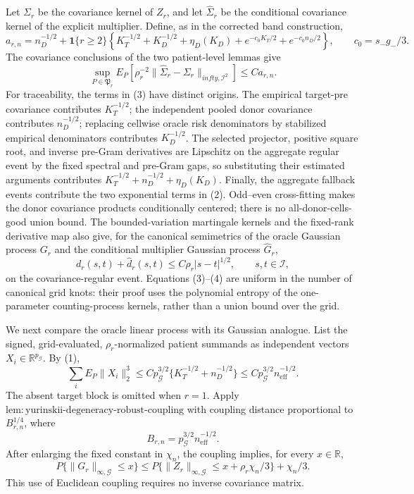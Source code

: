Let \(\Sigma_r\) be the covariance kernel of \(Z_r\), and let
\(\widehat\Sigma_r\) be the conditional covariance kernel of the explicit
multiplier.  Define, as in the corrected band construction,
\[
 a_{r,n}=n_D^{-1/2}+\mathbf1\{r\ge2\}
 \left\{K_T^{-1/2}+K_D^{-1/2}+\eta_D(K_D)
 +e^{-c_0K_T/2}+e^{-c_0n_D/2}\right\},
 \qquad c_0=s_-g_-/3.                                      \tag{2}
\]
The covariance conclusions of the two patient-level lemmas give
\[
 \sup_{P\in\mathfrak P_r}E_P\left[
 \rho_r^{-2}\|\widehat\Sigma_r-\Sigma_r\|_{infty,\mathcal I^2}
 \right]\le C a_{r,n}.                                    \tag{3}
\]
For traceability, the terms in (3) have distinct origins.  The empirical
target-pre covariance contributes \(K_T^{-1/2}\); the independent pooled
donor covariance contributes \(n_D^{-1/2}\); replacing cellwise oracle risk
denominators by stabilized empirical denominators contributes
\(K_D^{-1/2}\).  The selected projector, positive square root, and inverse
pre-Gram derivatives are Lipschitz on the aggregate regular event by the
fixed spectral and pre-Gram gaps, so substituting their estimated arguments
contributes \(K_T^{-1/2}+n_D^{-1/2}+\eta_D(K_D)\).  Finally, the aggregate
fallback events contribute the two exponential terms in (2).  Odd--even
cross-fitting makes the donor covariance products conditionally centered;
there is no all-donor-cells-good union bound.  The bounded-variation
martingale kernels and the fixed-rank derivative map also give, for the
canonical semimetrics of the oracle Gaussian process \(G_r\) and the
conditional multiplier Gaussian process \(\widehat G_r\),
\[
 d_r(s,t)+\widehat d_r(s,t)
 \le C\rho_r|s-t|^{1/2},\qquad s,t\in\mathcal I,            \tag{4}
\]
on the covariance-regular event.  Equations (3)--(4) are uniform in the
number of canonical grid knots: their proof uses the polynomial entropy of
the one-parameter counting-process kernels, rather than a union bound over
the grid.

We next compare the oracle linear process with its Gaussian analogue.  List
the signed, grid-evaluated, \(\rho_r\)-normalized patient summands as
independent vectors \(X_i\in\mathbb R^{p_{\mathcal G}}\).  By (1),
\[
 \sum_iE_P\|X_i\|_2^3
 \le C p_{\mathcal G}^{3/2}
 \{K_T^{-1/2}+n_D^{-1/2}\}
 \le C p_{\mathcal G}^{3/2}n_{\mathrm{eff}}^{-1/2}.        \tag{5}
\]
The absent target block is omitted when \(r=1\).  Apply
\(\mathrm{lem:yurinskii\mbox{-}degeneracy\mbox{-}robust\mbox{-}coupling}\)
with coupling distance proportional to
\(B_{r,n}^{1/4}\), where
\[
 B_{r,n}=p_{\mathcal G}^{3/2}n_{\mathrm{eff}}^{-1/2}.       \tag{6}
\]
After enlarging the fixed constant in \(\chi_n\), the coupling implies,
for every \(x\in\mathbb R\),
\[
 P\{\|G_r\|_{\infty,\mathcal G}\le x\}
 \le P\{\|Z_r\|_{\infty,\mathcal G}
          \le x+\rho_r\chi_n/3\}+\chi_n/3.                \tag{7}
\]
This use of Euclidean coupling requires no inverse covariance matrix.

